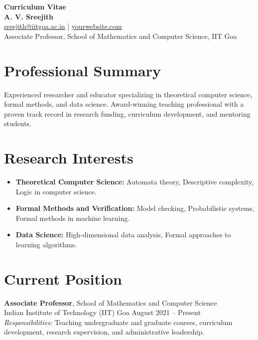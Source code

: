 \documentclass[11pt]{article}
\begin{document}
\begin{center}
    {\LARGE \textbf{Curriculum Vitae}} \\
    {\large \textbf{A. V. Sreejith}} \\
    \href{mailto:sreejith@iitgoa.ac.in}{sreejith@iitgoa.ac.in} | \href{https://yourwebsite.com}{yourwebsite.com} \\
    Associate Professor, School of Mathematics and Computer Science, IIT Goa
\end{center}

\vspace{0.5cm}

\section*{Professional Summary}
Experienced researcher and educator specializing in theoretical computer science, formal methods, and data science. Award-winning teaching professional with a proven track record in research funding, curriculum development, and mentoring students.

\section*{Research Interests}
\begin{itemize}
    \item \textbf{Theoretical Computer Science:} Automata theory, Descriptive complexity, Logic in computer science.
    \item \textbf{Formal Methods and Verification:} Model checking, Probabilistic systems, Formal methods in machine learning.
    \item \textbf{Data Science:} High-dimensional data analysis, Formal approaches to learning algorithms.
\end{itemize}

\section*{Current Position}
\textbf{Associate Professor}, School of Mathematics and Computer Science \\
Indian Institute of Technology (IIT) Goa \hfill August 2021 -- Present \\
\emph{Responsibilities:} Teaching undergraduate and graduate courses, curriculum development, research supervision, and administrative leadership.
\end{document}
